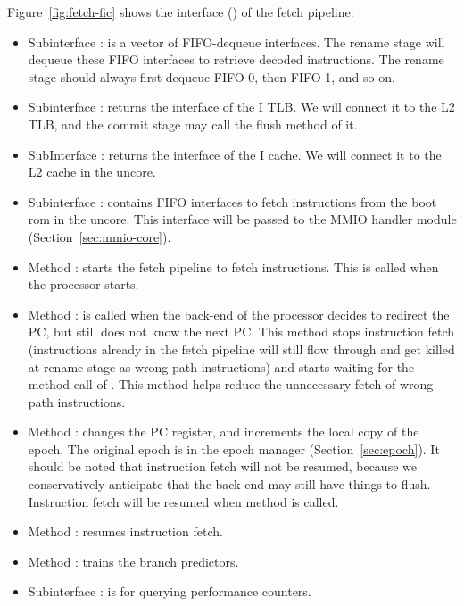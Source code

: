 Figure~\ref{fig:fetch-fic} shows the interface () of the fetch pipeline:
\begin{itemize}
    \item Subinterface : is a vector of FIFO-dequeue interfaces.
    The rename stage will dequeue these FIFO interfaces to retrieve decoded instructions.
    The rename stage should always first dequeue FIFO 0, then FIFO 1, and so on.
    \item Subinterface : returns the interface of the I TLB.
    We will connect it to the L2 TLB, and the commit stage may call the flush method of it.
    \item SubInterface : returns the interface of the I cache.
    We will connect it to the L2 cache in the uncore.
    \item Subinterface : contains FIFO interfaces to fetch instructions from the boot rom in the uncore.
    This interface will be passed to the MMIO handler module (Section~\ref{sec:mmio-core}).
    \item Method : starts the fetch pipeline to fetch instructions.
    This is called when the processor starts.
    \item Method : is called when the back-end of the processor decides to redirect the PC, but still does not know the next PC.
    This method stops instruction fetch (instructions already in the fetch pipeline will still flow through and get killed at rename stage as wrong-path instructions) and starts waiting for the method call of .
    This method helps reduce the unnecessary fetch of wrong-path instructions.
    \item Method : changes the PC register, and increments the local copy of the epoch.
    The original epoch is in the epoch manager (Section~\ref{sec:epoch}).
    It should be noted that instruction fetch will not be resumed, because we conservatively anticipate that the back-end may still have things to flush.
    Instruction fetch will be resumed when method  is called.
    \item Method : resumes instruction fetch.
    \item Method : trains the branch predictors.
    \item Subinterface : is for querying performance counters.
\end{itemize}

